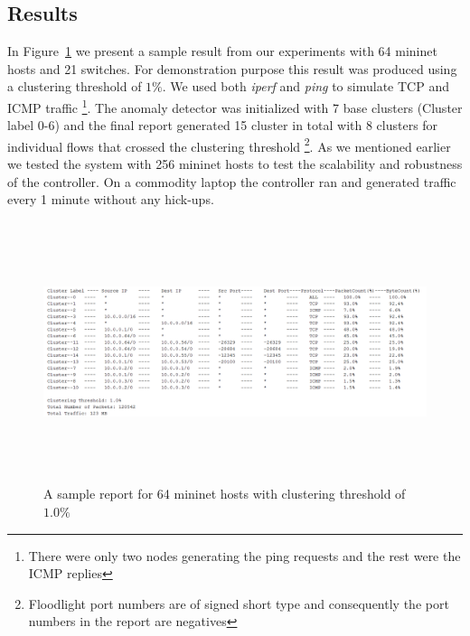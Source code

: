 \documentclass[twocolumn]{article}
\begin{document}
\subsection{Results}
In Figure~\ref{fig:results} we present a sample result from our experiments with 64 mininet hosts and 21 switches. For demonstration purpose this result was produced using a clustering threshold of $1\%$. We used both \emph{iperf} and \emph{ping} to simulate TCP and ICMP traffic \footnote{There were only two nodes generating the ping requests and the rest were the ICMP replies}. The anomaly detector was initialized with 7 base clusters (Cluster label 0-6) and the final report generated 15 cluster in total with 8 clusters for individual flows that crossed the clustering threshold \footnote{Floodlight port numbers are of signed short type and consequently the port numbers in the report are negatives}. As we mentioned earlier we tested the system with 256 mininet hosts to test the scalability and robustness of the controller. On a commodity laptop the controller ran and generated traffic every 1 minute without any hick-ups. 
\begin{figure}
\centering
	\includegraphics[width=\textwidth, height=3in]{images/results.png}
\caption{A sample report for 64 mininet hosts with clustering threshold of $1.0\%$}
\label{fig:results}
\end{figure}
\end{document}
